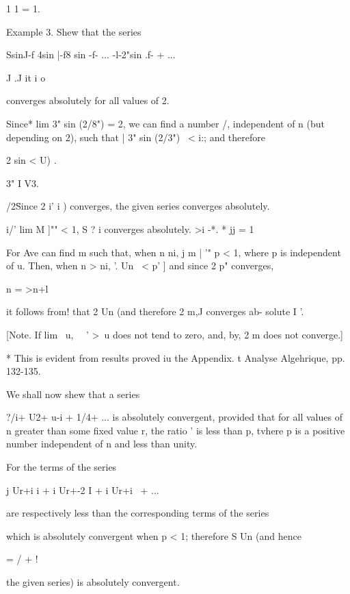 1 1 = 1.

Example 3. Shew that the series

SsinJ-f 4sin |-f8 sin -f- ... -l-2"sin .f- + ...

 J .J it i o

converges absolutely for all values of 2.

Since* lim 3" sin (2/8") = 2, we can find a number /, independent of
n (but depending on 2), such that | 3" sin (2/3") \ < i:; and
therefore

2 sin < U) .

3" I V3.

  /2\" Since 2 i' i ) converges, the given series converges
absolutely.

\Subsection{2}{3}{5}{Gauchy's test for absolute convergence']'.}

i/' lim M ]"" < 1, S ? i converges absolutely. >i -*. * jj = 1

For Ave can find m such that, when n ni, j m | '" p < 1, where p is
independent of u. Then, when n > ni, '. Un \ < p' ] and since 2 p"
converges,

n = >n+l

it follows from! that 2 Un (and therefore 2 m,J converges ab-
solute I '.

[Note. If lim \ u, \ \ ' >\, u does not tend to zero, and, by, 2
m does not converge.]

* This is evident from results proved iu the Appendix. t Analyse
Algehrique, pp. 132-135.

%
%


We shall now shew that a series

?/i+ U2+ u-i + 1/4+ ... is absolutely convergent, provided that for
all values of n greater than some fixed value r, the ratio ' is less
than p, tvhere p is a positive number independent of n and less than
unity.

For the terms of the series

j Ur+i i + i Ur+-2 I + i Ur+i \ + ...

are respectively less than the corresponding terms of the series

which is absolutely convergent when p < 1; therefore S Un (and hence

  = / + !

the given series) is absolutely convergent.

